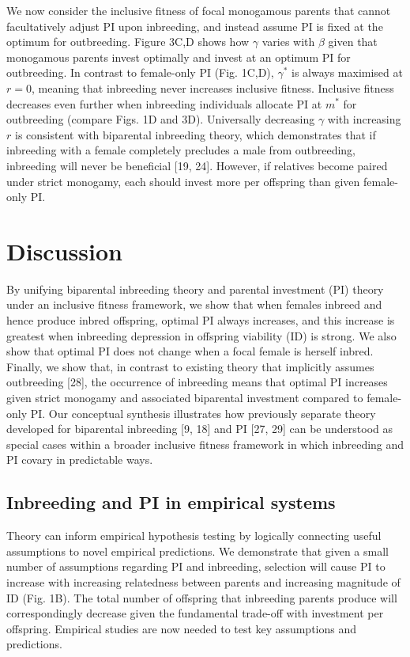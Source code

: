 \documentclass[12pt]{article}
\begin{document}
We now consider the inclusive fitness of focal monogamous parents that cannot facultatively adjust PI upon inbreeding, and instead assume PI is fixed at the optimum for outbreeding. Figure 3C,D shows how $\gamma$ varies with $\beta$ given that monogamous parents invest optimally and invest at an optimum PI for outbreeding. In contrast to female-only PI (Fig. 1C,D), $\gamma^{*}$ is always maximised at $r=0$, meaning that inbreeding never increases inclusive fitness. Inclusive fitness decreases even further when inbreeding individuals allocate PI at $m^{*}$ for outbreeding (compare Figs. 1D and 3D). Universally decreasing $\gamma$ with increasing $r$ is consistent with biparental inbreeding theory, which demonstrates that if inbreeding with a female completely precludes a male from outbreeding, inbreeding will never be beneficial [19, 24]. However, if relatives become paired under strict monogamy, each should invest more per offspring than given female-only PI.

\section*{Discussion}

By unifying biparental inbreeding theory and parental investment (PI) theory under an inclusive fitness framework, we show that when females inbreed and hence produce inbred offspring, optimal PI always increases, and this increase is greatest when inbreeding depression in offspring viability (ID) is strong. We also show that optimal PI does not change when a focal female is herself inbred. Finally, we show that, in contrast to existing theory that implicitly assumes outbreeding [28], the occurrence of inbreeding means that optimal PI increases given strict monogamy and associated biparental investment compared to female-only PI. Our conceptual synthesis illustrates how previously separate theory developed for biparental inbreeding [9, 18] and PI [27, 29] can be understood as special cases within a broader inclusive fitness framework in which inbreeding and PI covary in predictable ways.

\subsection*{Inbreeding and PI in empirical systems}

Theory can inform empirical hypothesis testing by logically connecting useful assumptions to novel empirical predictions. We demonstrate that given a small number of assumptions regarding PI and inbreeding, selection will cause PI to increase with increasing relatedness between parents and increasing magnitude of ID (Fig. 1B). The total number of offspring that inbreeding parents produce will correspondingly decrease given the fundamental trade-off with investment per offspring. Empirical studies are now needed to test key assumptions and predictions.
\end{document}
